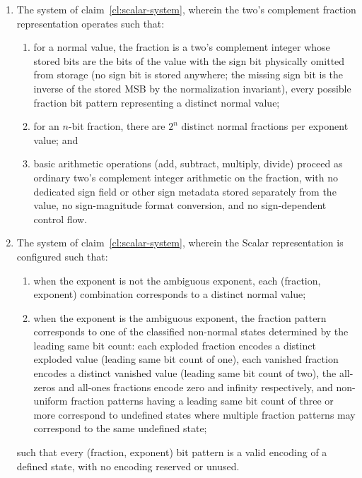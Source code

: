 \documentclass[12pt,letter]{article}
\begin{document}
\begin{enumerate}
    \item The system of claim~\ref{cl:scalar-system}, wherein the two's complement fraction representation operates such that:
          \begin{enumerate}
              \item for a normal value, the fraction is a two's complement integer whose stored bits are the bits of the value with the sign bit physically omitted from storage (no sign bit is stored anywhere; the missing sign bit is the inverse of the stored MSB by the normalization invariant), every possible fraction bit pattern representing a distinct normal value;
              \item for an $n$-bit fraction, there are $2^n$ distinct normal fractions per exponent value; and
              \item basic arithmetic operations (add, subtract, multiply, divide) proceed as ordinary two's complement integer arithmetic on the fraction, with no dedicated sign field or other sign metadata stored separately from the value, no sign-magnitude format conversion, and no sign-dependent control flow.
          \end{enumerate}

    \item The system of claim~\ref{cl:scalar-system}, wherein the Scalar representation is configured such that:
          \begin{enumerate}
              \item when the exponent is not the ambiguous exponent, each (fraction, exponent) combination corresponds to a distinct normal value;
              \item when the exponent is the ambiguous exponent, the fraction pattern corresponds to one of the classified non-normal states determined by the leading same bit count: each exploded fraction encodes a distinct exploded value (leading same bit count of one), each vanished fraction encodes a distinct vanished value (leading same bit count of two), the all-zeros and all-ones fractions encode zero and infinity respectively, and non-uniform fraction patterns having a leading same bit count of three or more correspond to undefined states where multiple fraction patterns may correspond to the same undefined state;
          \end{enumerate}
          such that every (fraction, exponent) bit pattern is a valid encoding of a defined state, with no encoding reserved or unused.


\end{enumerate}
\end{document}
